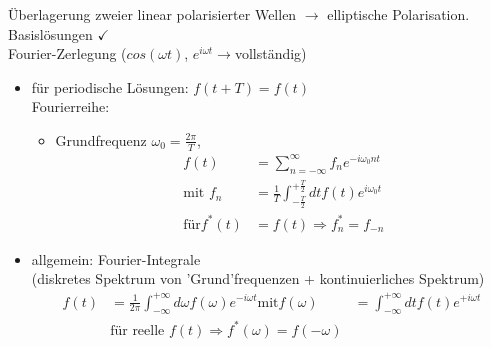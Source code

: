 \documentclass[a4paper]{article}
\begin{document}
Überlagerung zweier linear polarisierter Wellen $\rightarrow$ elliptische
Polarisation. \\ Basislösungen $\checkmark$\\
Fourier-Zerlegung ($cos(\omega t)$, $e^{i\omega t}\rightarrow$vollständig)
\begin{itemize}
  \item für periodische Lösungen: $f(t+T)=f(t)$\\ 
  Fourierreihe: 
  \begin{itemize}
  \item Grundfrequenz $\omega_0=\frac{2\pi}{T}$, \begin{align}
  f(t)&=\sum_{n=-\infty}^\infty f_n e^{-i\omega_0nt}\\
  \text{mit } f_n&=\frac{1}{T}\int_{-\frac{T}{2}}^{+\frac{T}{2}}dt f(t)
  e^{i\omega_0 t} \\
  \text{für} f^*(t)&=f(t) \Rightarrow f_n^*=f_{-n}
  \end{align}
\end{itemize}
\item allgemein: Fourier-Integrale \\(diskretes Spektrum von 'Grund'frequenzen
+ kontinuierliches Spektrum) \begin{align}
f(t)&=\frac{1}{2\pi}\int_{-\infty}^{+\infty} d\omega f(\omega)e^{-i\omega t}
\text{mit} f(\omega)&=\int_{-\infty}^{+\infty} dt f(t)e^{+i\omega t}\\
&\text{für reelle } f(t) \Rightarrow f^*(\omega)=f(-\omega)
\end{align}
\end{itemize}
\end{document}
